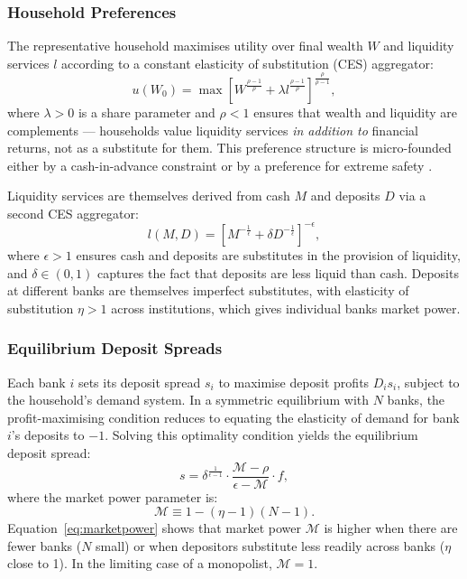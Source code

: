 \documentclass[12pt,a4paper]{article}
\begin{document}
\subsubsection{Household Preferences}

The representative household maximises utility over final wealth $W$ and
liquidity services $l$ according to a constant elasticity of substitution
(CES) aggregator:
\begin{equation}
  u(W_0) = \max \left[ W^{\frac{\rho-1}{\rho}} + \lambda
  l^{\frac{\rho-1}{\rho}} \right]^{\frac{\rho}{\rho-1}},
  \label{eq:utility}
\end{equation}
where $\lambda > 0$ is a share parameter and $\rho < 1$ ensures that wealth
and liquidity are complements --- households value liquidity services
\emph{in addition to} financial returns, not as a substitute for them. This
preference structure is micro-founded either by a cash-in-advance constraint
\citep{gali_2009} or by a preference for extreme safety \citep{stein_2012}.

Liquidity services are themselves derived from cash $M$ and deposits $D$ via
a second CES aggregator:
\begin{equation}
  l(M, D) = \left[ M^{-\frac{1}{\epsilon}} + \delta
  D^{-\frac{1}{\epsilon}} \right]^{-\epsilon},
  \label{eq:liquidity}
\end{equation}
where $\epsilon > 1$ ensures cash and deposits are substitutes in the
provision of liquidity, and $\delta \in (0,1)$ captures the fact that deposits
are less liquid than cash. Deposits at different banks are themselves
imperfect substitutes, with elasticity of substitution $\eta > 1$ across
institutions, which gives individual banks market power.

\subsubsection{Equilibrium Deposit Spreads}

Each bank $i$ sets its deposit spread $s_i$ to maximise deposit profits
$D_i s_i$, subject to the household's demand system. In a symmetric
equilibrium with $N$ banks, the profit-maximising condition reduces to
equating the elasticity of demand for bank $i$'s deposits to $-1$. Solving
this optimality condition yields the equilibrium deposit spread:
\begin{equation}
  s = \delta^{\frac{1}{\epsilon-1}} \cdot
  \frac{\mathcal{M} - \rho}{\epsilon - \mathcal{M}} \cdot f,
  \label{eq:spread}
\end{equation}
where the market power parameter is:
\begin{equation}
  \mathcal{M} \equiv 1 - (\eta - 1)(N - 1).
  \label{eq:marketpower}
\end{equation}
Equation~\eqref{eq:marketpower} shows that market power $\mathcal{M}$ is
higher when there are fewer banks ($N$ small) or when depositors substitute
less readily across banks ($\eta$ close to 1). In the limiting case of a
monopolist, $\mathcal{M} = 1$.
\end{document}
